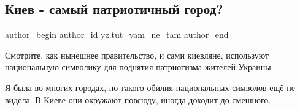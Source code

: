  
 
 
 
 
\subsection{Киев - самый патриотичный город?}
\label{sec:28_12_2021.yz.tut_vam_ne_tam.1.kiev_patriotichnyj_gorod}

\ifcmt
 author_begin
   author_id yz.tut_vam_ne_tam
 author_end
\fi

Смотрите, как нынешнее правительство, и сами киевляне, используют национальную
символику для поднятия патриотизма жителей Украины.

Я была во многих городах, но такого обилия национальных символов ещё не видела.
В Киеве они окружают повсюду, иногда доходит до смешного.

